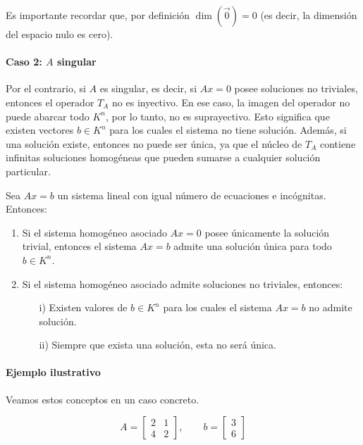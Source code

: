 \begin{tcolorbox}[remember,title=Recordatorio]
  Es importante recordar que, por definición \(\dim\left({\vec{0}}\right) = 0\) (es decir, la dimensión del espacio nulo es cero).
\end{tcolorbox}

\paragraph{Caso 2: \(A\) singular}

Por el contrario, si \(A\) es singular, es decir, si \(Ax = 0\) posee soluciones no triviales, entonces el operador \(T_A\) no es inyectivo. En ese caso, la imagen del operador no puede abarcar todo \(K^n\), por lo tanto, no es suprayectivo. Esto significa que existen vectores \(b \in K^n\) para los cuales el sistema no tiene solución. Además, si una solución existe, entonces no puede ser única, ya que el núcleo de \(T_A\) contiene infinitas soluciones homogéneas que pueden sumarse a cualquier solución particular.

\teorema Sea \(Ax = b\) un sistema lineal con igual número de ecuaciones e incógnitas. Entonces:
\begin{enumerate}[label=\alph*)]
  \item Si el sistema homogéneo asociado \(Ax = 0\) posee únicamente la solución trivial, entonces el sistema \(Ax = b\) admite una solución única para todo \(b \in K^n\).
  \item Si el sistema homogéneo asociado admite soluciones no triviales, entonces:
  \begin{itemize}
    \item[i)] Existen valores de \(b \in K^n\) para los cuales el sistema \(Ax = b\) no admite solución.
    \item[ii)] Siempre que exista una solución, esta no será única.
  \end{itemize}
\end{enumerate}

\paragraph{Ejemplo ilustrativo}

Veamos estos conceptos en un caso concreto.

\[
  A = \begin{bmatrix}
    2 & 1 \\
    4 & 2
  \end{bmatrix}, \qquad b = \begin{bmatrix}
    3 \\
    6
  \end{bmatrix}
\]


